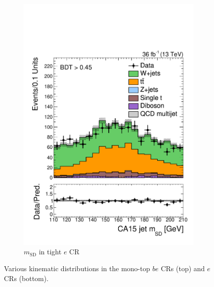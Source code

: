 \begin{figure}[]
\begin{center}
\begin{subfigure}[t]{0.32\textwidth}
            \includegraphics[width=\textwidth]{figures/monotop/prefit/singleelectronw_tight_fj1MSD.pdf}
            \caption{$m_\mathrm{SD}$ in tight $e$ CR}
        \end{subfigure}
        \caption{Various kinematic distributions in the mono-top $be$ CRs (top) and $e$ CRs (bottom).}
        \label{fig:mt:prefit_en}
    \end{center}
\end{figure}

